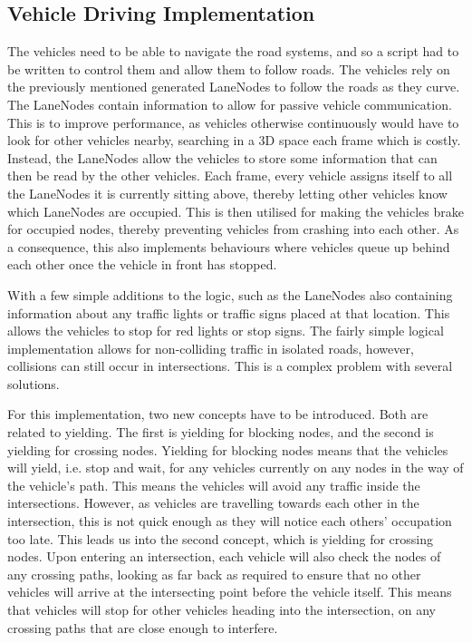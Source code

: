     \subsection{Vehicle Driving Implementation}
        The vehicles need to be able to navigate the road systems, and so a script had to be written to control them and allow them to follow roads. The vehicles rely on the previously mentioned generated LaneNodes to follow the roads as they curve. The LaneNodes contain information to allow for passive vehicle communication. This is to improve performance, as vehicles otherwise continuously would have to look for other vehicles nearby, searching in a 3D space each frame which is costly. Instead, the LaneNodes allow the vehicles to store some information that can then be read by the other vehicles. Each frame, every vehicle assigns itself to all the LaneNodes it is currently sitting above, thereby letting other vehicles know which LaneNodes are occupied. This is then utilised for making the vehicles brake for occupied nodes, thereby preventing vehicles from crashing into each other. As a consequence, this also implements behaviours where vehicles queue up behind each other once the vehicle in front has stopped.
    
        With a few simple additions to the logic, such as the LaneNodes also containing information about any traffic lights or traffic signs placed at that location. This allows the vehicles to stop for red lights or stop signs. The fairly simple logical implementation allows for non-colliding traffic in isolated roads, however, collisions can still occur in intersections. This is a complex problem with several solutions.
    
        For this implementation, two new concepts have to be introduced. Both are related to yielding. The first is yielding for blocking nodes, and the second is yielding for crossing nodes. Yielding for blocking nodes means that the vehicles will yield, i.e. stop and wait, for any vehicles currently on any nodes in the way of the vehicle's path. This means the vehicles will avoid any traffic inside the intersections. However, as vehicles are travelling towards each other in the intersection, this is not quick enough as they will notice each others' occupation too late. This leads us into the second concept, which is yielding for crossing nodes. Upon entering an intersection, each vehicle will also check the nodes of any crossing paths, looking as far back as required to ensure that no other vehicles will arrive at the intersecting point before the vehicle itself. This means that vehicles will stop for other vehicles heading into the intersection, on any crossing paths that are close enough to interfere.
    
